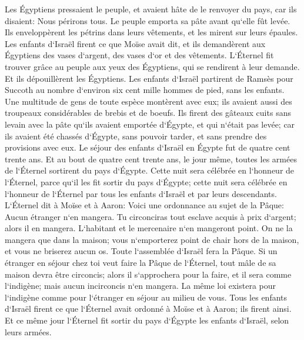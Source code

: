 \verse Les Égyptiens pressaient le peuple, et avaient hâte de le renvoyer du pays, car ils disaient: Nous périrons tous. 
\verse Le peuple emporta sa pâte avant qu`elle fût levée. Ils enveloppèrent les pétrins dans leurs vêtements, et les mirent sur leurs épaules. 
\verse Les enfants d`Israël firent ce que Moïse avait dit, et ils demandèrent aux Égyptiens des vases d`argent, des vases d`or et des vêtements. 
\verse L`Éternel fit trouver grâce au peuple aux yeux des Égyptiens, qui se rendirent à leur demande. Et ils dépouillèrent les Égyptiens. 
\verse Les enfants d`Israël partirent de Ramsès pour Succoth au nombre d`environ six cent mille hommes de pied, sans les enfants. 
\verse Une multitude de gens de toute espèce montèrent avec eux; ils avaient aussi des troupeaux considérables de brebis et de boeufs. 
\verse Ils firent des gâteaux cuits sans levain avec la pâte qu`ils avaient emportée d`Égypte, et qui n`était pas levée; car ils avaient été chassés d`Égypte, sans pouvoir tarder, et sans prendre des provisions avec eux. 
\verse Le séjour des enfants d`Israël en Égypte fut de quatre cent trente ans. 
\verse Et au bout de quatre cent trente ans, le jour même, toutes les armées de l`Éternel sortirent du pays d`Égypte. 
\verse Cette nuit sera célébrée en l`honneur de l`Éternel, parce qu`il les fit sortir du pays d`Égypte; cette nuit sera célébrée en l`honneur de l`Éternel par tous les enfants d`Israël et par leurs descendants. 
\verse L`Éternel dit à Moïse et à Aaron: Voici une ordonnance au sujet de la Pâque: Aucun étranger n`en mangera. 
\verse Tu circonciras tout esclave acquis à prix d`argent; alors il en mangera. 
\verse L`habitant et le mercenaire n`en mangeront point. 
\verse On ne la mangera que dans la maison; vous n`emporterez point de chair hors de la maison, et vous ne briserez aucun os. 
\verse Toute l`assemblée d`Israël fera la Pâque. 
\verse Si un étranger en séjour chez toi veut faire la Pâque de l`Éternel, tout mâle de sa maison devra être circoncis; alors il s`approchera pour la faire, et il sera comme l`indigène; mais aucun incirconcis n`en mangera. 
\verse La même loi existera pour l`indigène comme pour l`étranger en séjour au milieu de vous. 
\verse Tous les enfants d`Israël firent ce que l`Éternel avait ordonné à Moïse et à Aaron; ils firent ainsi. 
\verse Et ce même jour l`Éternel fit sortir du pays d`Égypte les enfants d`Israël, selon leurs armées. 

